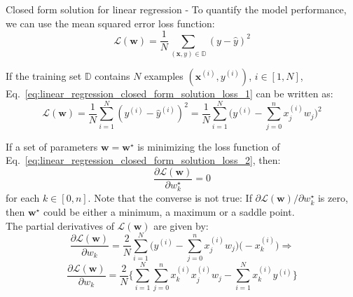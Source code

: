 \begin{frame}[t,allowframebreaks]{Closed form solution for linear regression -}
    To quantify the model performance, we can use the
     
    \gls{mean squared error loss function}:
    \begin{equation}
        \mathcal{L}(\mathbf{w}) =  
        \frac{1}{N} 
        \sum_{(\mathbf{x},y) \in \mathbb{D}} 
        (y - \hat{y})^2 
        \label{eq:linear_regression_closed_form_solution_loss_1}
    \end{equation}

    If the training set $\mathbb{D}$ contains $N$ examples 
    $(\mathbf{x}^{(i)},y^{(i)})$, $i \in [1,N]$,
    Eq.~\ref{eq:linear_regression_closed_form_solution_loss_1}
    can be written as:
    \begin{equation}
        \mathcal{L}(\mathbf{w}) =  
        \frac{1}{N} 
        \sum_{i=1}^{N} 
        (y^{(i)} - \hat{y}^{(i)})^2 =
        \frac{1}{N} 
        \sum_{i=1}^{N} 
        \Big(y^{(i)} - \sum_{j=0}^{n} x_j^{(i)} w_j\Big)^2
        \label{eq:linear_regression_closed_form_solution_loss_2}
    \end{equation}

    \framebreak

    If a set of parameters $\mathbf{w}=\mathbf{w}^\star$ 
    is minimizing the \gls{loss function} 
    of Eq.~\ref{eq:linear_regression_closed_form_solution_loss_2}, 
    then:
    \begin{equation}
        \frac{\partial \mathcal{L}(\mathbf{w})}{\partial w_k^\star} = 0
        \label{eq:linear_regression_closed_form_solution_zero_derivative}
    \end{equation}
    for each $k \in [0,n]$.
    Note that the converse is not true: 
    If $\partial \mathcal{L}(\mathbf{w})/\partial w_k^\star$ is zero, then
    $\mathbf{w}^\star$ could be either a minimum, a maximum or a saddle point.\\
    \vspace{0.2cm}
    The partial derivatives of $\mathcal{L}(\mathbf{w})$ are given by:
    \begin{equation*}
        \frac{\partial \mathcal{L}(\mathbf{w})}{\partial w_k} =
        \frac{2}{N} 
        \sum_{i=1}^{N} 
        \Big(y^{(i)} - \sum_{j=0}^{n} x_j^{(i)} w_j\Big)\Big(-x_k^{(i)}\Big) \Rightarrow
    \end{equation*}
    \begin{equation}
        \frac{\partial \mathcal{L}(\mathbf{w})}{\partial w_k} =
        \frac{2}{N} 
        \Big\{             
        \sum_{i=1}^{N} \sum_{j=0}^{n} x_k^{(i)} x_j^{(i)} w_j -
        \sum_{i=1}^{N} x_k^{(i)} y^{(i)}  
        \Big\}
        \label{eq:linear_regression_closed_form_solution_derivative_calculation}
    \end{equation}


\end{frame}
